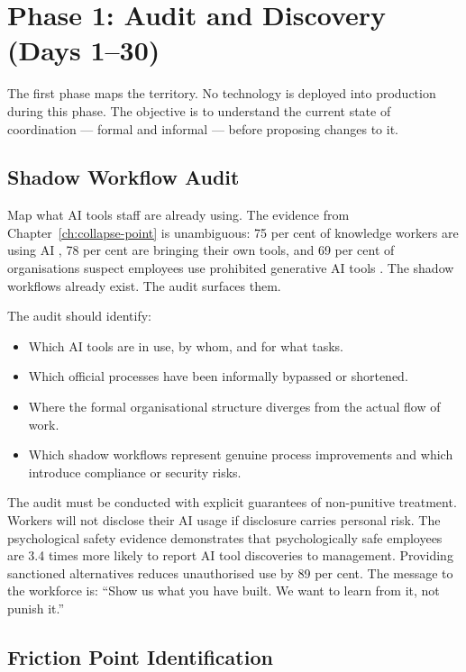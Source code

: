 \section{Phase 1: Audit and Discovery (Days 1--30)}

The first phase maps the territory. No technology is deployed into production during this phase. The objective is to understand the current state of coordination --- formal and informal --- before proposing changes to it.

\subsection{Shadow Workflow Audit}

Map what AI tools staff are already using. The evidence from Chapter~\ref{ch:collapse-point} is unambiguous: 75 per cent of knowledge workers are using AI \parencite{MicrosoftWorkTrend2024}, 78 per cent are bringing their own tools, and 69 per cent of organisations suspect employees use prohibited generative AI tools \parencite{Gartner2025}. The shadow workflows already exist. The audit surfaces them.

The audit should identify:
\begin{itemize}
  \item Which AI tools are in use, by whom, and for what tasks.
  \item Which official processes have been informally bypassed or shortened.
  \item Where the formal organisational structure diverges from the actual flow of work.
  \item Which shadow workflows represent genuine process improvements and which introduce compliance or security risks.
\end{itemize}

The audit must be conducted with explicit guarantees of non-punitive treatment. Workers will not disclose their AI usage if disclosure carries personal risk. The psychological safety evidence \parencite{EdmondsonLei2025} demonstrates that psychologically safe employees are 3.4 times more likely to report AI tool discoveries to management. Providing sanctioned alternatives reduces unauthorised use by 89 per cent. The message to the workforce is: ``Show us what you have built. We want to learn from it, not punish it.''

\subsection{Friction Point Identification}

